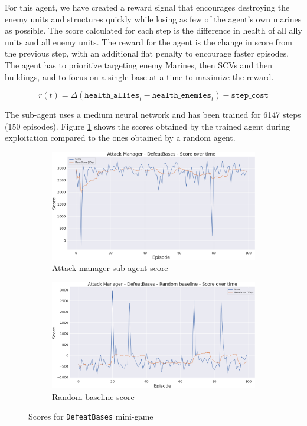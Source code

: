 For this agent, we have created a reward signal that encourages destroying the enemy units and structures quickly while losing as few of the agent's own marines as possible. The score calculated for each step is the difference in health of all ally units and all enemy units. The reward for the agent is the change in score from the previous step, with an additional flat penalty to encourage faster episodes. The agent has to prioritize targeting enemy Marines, then SCVs and then buildings, and to focus on a single base at a time to maximize the reward.

$$
r(t) = \Delta(\texttt{health\_allies}_{t} - \texttt{health\_enemies}_{t}) - \texttt{step\_cost}
$$

The sub-agent uses a medium neural network and has been trained for 6147 steps (150 episodes). Figure \ref{fig:DefeatBases_scores} shows the scores obtained by the trained agent during exploitation compared to the ones obtained by a random agent.

\begin{figure}[t]
    \centering
    \begin{subfigure}[b]{0.495\textwidth}
        \includegraphics[width=1\textwidth]{figs/multi_dqn_army_attack_manager/exploit/score.png}
        \caption{Attack manager sub-agent score}
    \end{subfigure}
    \begin{subfigure}[b]{0.495\textwidth}
        \includegraphics[width=1\textwidth]{figs/multi_random_army_attack_manager/exploit/score.png}
        \caption{Random baseline score}
    \end{subfigure}
    \caption{Scores for \texttt{DefeatBases} mini-game}
    \label{fig:DefeatBases_scores}
\end{figure}

